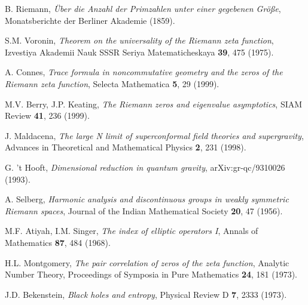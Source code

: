 \documentclass[12pt]{article}
\begin{document}
\begin{thebibliography}{99}

 B. Riemann, \emph{Über die Anzahl der Primzahlen unter einer gegebenen Größe}, Monatsberichte der Berliner Akademie (1859).

 S.M. Voronin, \emph{Theorem on the universality of the Riemann zeta function}, Izvestiya Akademii Nauk SSSR Seriya Matematicheskaya \textbf{39}, 475 (1975).

 A. Connes, \emph{Trace formula in noncommutative geometry and the zeros of the Riemann zeta function}, Selecta Mathematica \textbf{5}, 29 (1999).

 M.V. Berry, J.P. Keating, \emph{The Riemann zeros and eigenvalue asymptotics}, SIAM Review \textbf{41}, 236 (1999).

 J. Maldacena, \emph{The large N limit of superconformal field theories and supergravity}, Advances in Theoretical and Mathematical Physics \textbf{2}, 231 (1998).

 G. 't Hooft, \emph{Dimensional reduction in quantum gravity}, arXiv:gr-qc/9310026 (1993).

 A. Selberg, \emph{Harmonic analysis and discontinuous groups in weakly symmetric Riemann spaces}, Journal of the Indian Mathematical Society \textbf{20}, 47 (1956).

 M.F. Atiyah, I.M. Singer, \emph{The index of elliptic operators I}, Annals of Mathematics \textbf{87}, 484 (1968).

 H.L. Montgomery, \emph{The pair correlation of zeros of the zeta function}, Analytic Number Theory, Proceedings of Symposia in Pure Mathematics \textbf{24}, 181 (1973).

 J.D. Bekenstein, \emph{Black holes and entropy}, Physical Review D \textbf{7}, 2333 (1973).

\end{thebibliography}
\end{document}
